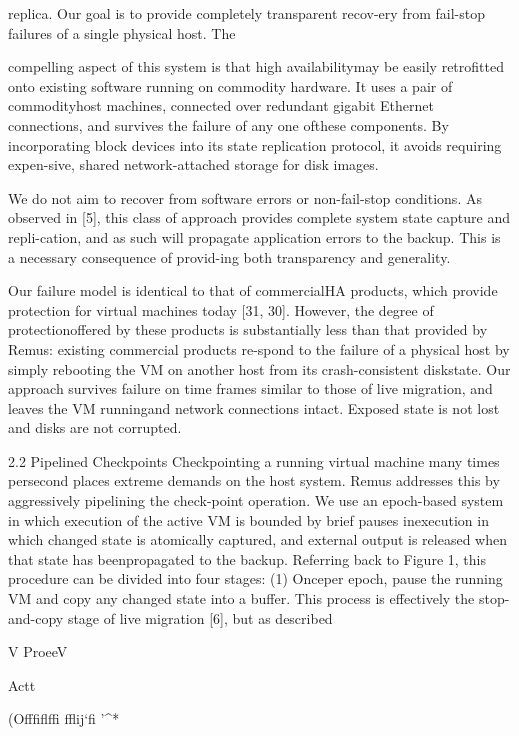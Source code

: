 replica.
Our goal is to provide completely transparent recov-ery from fail-stop failures of a single physical host. The

compelling aspect of this system is that high availabilitymay be easily retrofitted onto existing software running
on commodity hardware. It uses a pair of commodityhost machines, connected over redundant gigabit Ethernet connections, and survives the failure of any one ofthese components. By incorporating block devices into
its state replication protocol, it avoids requiring expen-sive, shared network-attached storage for disk images.

We do not aim to recover from software errors or non-fail-stop conditions. As observed in [5], this class of approach provides complete system state capture and repli-cation, and as such will propagate application errors to
the backup. This is a necessary consequence of provid-ing both transparency and generality.

Our failure model is identical to that of commercialHA products, which provide protection for virtual machines today [31, 30]. However, the degree of protectionoffered by these products is substantially less than that
provided by Remus: existing commercial products re-spond to the failure of a physical host by simply rebooting the VM on another host from its crash-consistent diskstate. Our approach survives failure on time frames similar to those of live migration, and leaves the VM runningand network connections intact. Exposed state is not lost
and disks are not corrupted.

2.2 Pipelined Checkpoints
Checkpointing a running virtual machine many times persecond places extreme demands on the host system. Remus addresses this by aggressively pipelining the check-point operation. We use an epoch-based system in which
execution of the active VM is bounded by brief pauses inexecution in which changed state is atomically captured,
and external output is released when that state has beenpropagated to the backup. Referring back to Figure 1,
this procedure can be divided into four stages: (1) Onceper epoch, pause the running VM and copy any changed
state into a buffer. This process is effectively the stop-and-copy stage of live migration [6], but as described

V\Gamma \Gamma 
Pro\Delta e\Theta \Delta e\Lambda  V\Gamma 

Act\Xi \Pi \Sigma  \Upsilon \Phi \Psi t

(O\Omega fffiflffi
ffli\Omega j`fi '^*\Omega *

